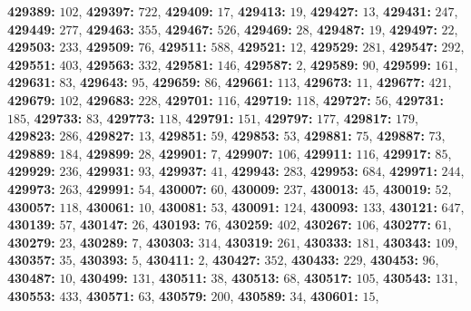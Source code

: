\textsf{\bfseries 429389:} $102$, \textsf{\bfseries 429397:} $722$, \textsf{\bfseries 429409:} $17$, \textsf{\bfseries 429413:} $19$, \textsf{\bfseries 429427:} $13$, \textsf{\bfseries 429431:} $247$, \textsf{\bfseries 429449:} $277$, \textsf{\bfseries 429463:} $355$, \textsf{\bfseries 429467:} $526$, \textsf{\bfseries 429469:} $28$, \textsf{\bfseries 429487:} $19$, \textsf{\bfseries 429497:} $22$, \textsf{\bfseries 429503:} $233$, \textsf{\bfseries 429509:} $76$, \textsf{\bfseries 429511:} $588$, \textsf{\bfseries 429521:} $12$, \textsf{\bfseries 429529:} $281$, \textsf{\bfseries 429547:} $292$, \textsf{\bfseries 429551:} $403$, \textsf{\bfseries 429563:} $332$, \textsf{\bfseries 429581:} $146$, \textsf{\bfseries 429587:} $2$, \textsf{\bfseries 429589:} $90$, \textsf{\bfseries 429599:} $161$, \textsf{\bfseries 429631:} $83$, \textsf{\bfseries 429643:} $95$, \textsf{\bfseries 429659:} $86$, \textsf{\bfseries 429661:} $113$, \textsf{\bfseries 429673:} $11$, \textsf{\bfseries 429677:} $421$, \textsf{\bfseries 429679:} $102$, \textsf{\bfseries 429683:} $228$, \textsf{\bfseries 429701:} $116$, \textsf{\bfseries 429719:} $118$, \textsf{\bfseries 429727:} $56$, \textsf{\bfseries 429731:} $185$, \textsf{\bfseries 429733:} $83$, \textsf{\bfseries 429773:} $118$, \textsf{\bfseries 429791:} $151$, \textsf{\bfseries 429797:} $177$, \textsf{\bfseries 429817:} $179$, \textsf{\bfseries 429823:} $286$, \textsf{\bfseries 429827:} $13$, \textsf{\bfseries 429851:} $59$, \textsf{\bfseries 429853:} $53$, \textsf{\bfseries 429881:} $75$, \textsf{\bfseries 429887:} $73$, \textsf{\bfseries 429889:} $184$, \textsf{\bfseries 429899:} $28$, \textsf{\bfseries 429901:} $7$, \textsf{\bfseries 429907:} $106$, \textsf{\bfseries 429911:} $116$, \textsf{\bfseries 429917:} $85$, \textsf{\bfseries 429929:} $236$, \textsf{\bfseries 429931:} $93$, \textsf{\bfseries 429937:} $41$, \textsf{\bfseries 429943:} $283$, \textsf{\bfseries 429953:} $684$, \textsf{\bfseries 429971:} $244$, \textsf{\bfseries 429973:} $263$, \textsf{\bfseries 429991:} $54$, \textsf{\bfseries 430007:} $60$, \textsf{\bfseries 430009:} $237$, \textsf{\bfseries 430013:} $45$, \textsf{\bfseries 430019:} $52$, \textsf{\bfseries 430057:} $118$, \textsf{\bfseries 430061:} $10$, \textsf{\bfseries 430081:} $53$, \textsf{\bfseries 430091:} $124$, \textsf{\bfseries 430093:} $133$, \textsf{\bfseries 430121:} $647$, \textsf{\bfseries 430139:} $57$, \textsf{\bfseries 430147:} $26$, \textsf{\bfseries 430193:} $76$, \textsf{\bfseries 430259:} $402$, \textsf{\bfseries 430267:} $106$, \textsf{\bfseries 430277:} $61$, \textsf{\bfseries 430279:} $23$, \textsf{\bfseries 430289:} $7$, \textsf{\bfseries 430303:} $314$, \textsf{\bfseries 430319:} $261$, \textsf{\bfseries 430333:} $181$, \textsf{\bfseries 430343:} $109$, \textsf{\bfseries 430357:} $35$, \textsf{\bfseries 430393:} $5$, \textsf{\bfseries 430411:} $2$, \textsf{\bfseries 430427:} $352$, \textsf{\bfseries 430433:} $229$, \textsf{\bfseries 430453:} $96$, \textsf{\bfseries 430487:} $10$, \textsf{\bfseries 430499:} $131$, \textsf{\bfseries 430511:} $38$, \textsf{\bfseries 430513:} $68$, \textsf{\bfseries 430517:} $105$, \textsf{\bfseries 430543:} $131$, \textsf{\bfseries 430553:} $433$, \textsf{\bfseries 430571:} $63$, \textsf{\bfseries 430579:} $200$, \textsf{\bfseries 430589:} $34$, \textsf{\bfseries 430601:} $15$, 
